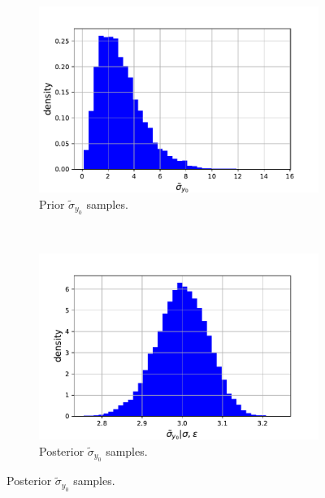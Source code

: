 \documentclass{article}
\begin{document}
\begin{figure}[htb!]
		\begin{subfigure}[b]{0.45\textwidth}
			\centering
			\includegraphics[width=\textwidth]{Q3a_2.pdf}
			\caption{Prior $\tilde{\sigma}_{y_0}$ samples.}
		\end{subfigure}
		~
		\begin{subfigure}[b]{0.45\textwidth}
			\centering
			\includegraphics[width=\textwidth]{Q3a_7.pdf}
			\caption{Posterior $\tilde{\sigma}_{y_0}$ samples.}
		\end{subfigure}
	

\end{figure}
\end{document}

